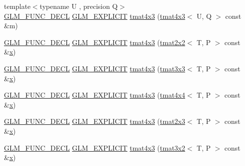 \begin{DoxyCompactItemize}
{\footnotesize template$<$typename U , precision Q$>$ }\\\mbox{\hyperlink{setup_8hpp_ab2d052de21a70539923e9bcbf6e83a51}{G\+L\+M\+\_\+\+F\+U\+N\+C\+\_\+\+D\+E\+CL}} \mbox{\hyperlink{setup_8hpp_a6c74f5a5e7b134ab69023ff9a30d4d5d}{G\+L\+M\+\_\+\+E\+X\+P\+L\+I\+C\+IT}} \mbox{\hyperlink{structglm_1_1tmat4x3_aa0103a8d29b63892bf75c1f28cccfe23}{tmat4x3}} (\mbox{\hyperlink{structglm_1_1tmat4x3}{tmat4x3}}$<$ U, Q $>$ const \&m)
\item 
\mbox{\hyperlink{setup_8hpp_ab2d052de21a70539923e9bcbf6e83a51}{G\+L\+M\+\_\+\+F\+U\+N\+C\+\_\+\+D\+E\+CL}} \mbox{\hyperlink{setup_8hpp_a6c74f5a5e7b134ab69023ff9a30d4d5d}{G\+L\+M\+\_\+\+E\+X\+P\+L\+I\+C\+IT}} \mbox{\hyperlink{structglm_1_1tmat4x3_a0a7982fe88164b1cc7ae9ddac2b62ac0}{tmat4x3}} (\mbox{\hyperlink{structglm_1_1tmat2x2}{tmat2x2}}$<$ T, P $>$ const \&\mbox{\hyperlink{glad_8h_a92d0386e5c19fb81ea88c9f99644ab1d}{x}})
\item 
\mbox{\hyperlink{setup_8hpp_ab2d052de21a70539923e9bcbf6e83a51}{G\+L\+M\+\_\+\+F\+U\+N\+C\+\_\+\+D\+E\+CL}} \mbox{\hyperlink{setup_8hpp_a6c74f5a5e7b134ab69023ff9a30d4d5d}{G\+L\+M\+\_\+\+E\+X\+P\+L\+I\+C\+IT}} \mbox{\hyperlink{structglm_1_1tmat4x3_a28c08dee803c5fb0fe8c2c824f58681d}{tmat4x3}} (\mbox{\hyperlink{structglm_1_1tmat3x3}{tmat3x3}}$<$ T, P $>$ const \&\mbox{\hyperlink{glad_8h_a92d0386e5c19fb81ea88c9f99644ab1d}{x}})
\item 
\mbox{\hyperlink{setup_8hpp_ab2d052de21a70539923e9bcbf6e83a51}{G\+L\+M\+\_\+\+F\+U\+N\+C\+\_\+\+D\+E\+CL}} \mbox{\hyperlink{setup_8hpp_a6c74f5a5e7b134ab69023ff9a30d4d5d}{G\+L\+M\+\_\+\+E\+X\+P\+L\+I\+C\+IT}} \mbox{\hyperlink{structglm_1_1tmat4x3_ad5011e7aaaeddf6ca91742217d07a8d2}{tmat4x3}} (\mbox{\hyperlink{structglm_1_1tmat4x4}{tmat4x4}}$<$ T, P $>$ const \&\mbox{\hyperlink{glad_8h_a92d0386e5c19fb81ea88c9f99644ab1d}{x}})
\item 
\mbox{\hyperlink{setup_8hpp_ab2d052de21a70539923e9bcbf6e83a51}{G\+L\+M\+\_\+\+F\+U\+N\+C\+\_\+\+D\+E\+CL}} \mbox{\hyperlink{setup_8hpp_a6c74f5a5e7b134ab69023ff9a30d4d5d}{G\+L\+M\+\_\+\+E\+X\+P\+L\+I\+C\+IT}} \mbox{\hyperlink{structglm_1_1tmat4x3_ac73e3e89eac9d9d6b6f8dbb49f55a0e2}{tmat4x3}} (\mbox{\hyperlink{structglm_1_1tmat2x3}{tmat2x3}}$<$ T, P $>$ const \&\mbox{\hyperlink{glad_8h_a92d0386e5c19fb81ea88c9f99644ab1d}{x}})
\item 
\mbox{\hyperlink{setup_8hpp_ab2d052de21a70539923e9bcbf6e83a51}{G\+L\+M\+\_\+\+F\+U\+N\+C\+\_\+\+D\+E\+CL}} \mbox{\hyperlink{setup_8hpp_a6c74f5a5e7b134ab69023ff9a30d4d5d}{G\+L\+M\+\_\+\+E\+X\+P\+L\+I\+C\+IT}} \mbox{\hyperlink{structglm_1_1tmat4x3_a125210f891f2b11559d36ea49cbb66ba}{tmat4x3}} (\mbox{\hyperlink{structglm_1_1tmat3x2}{tmat3x2}}$<$ T, P $>$ const \&\mbox{\hyperlink{glad_8h_a92d0386e5c19fb81ea88c9f99644ab1d}{x}})

\end{DoxyCompactItemize}
